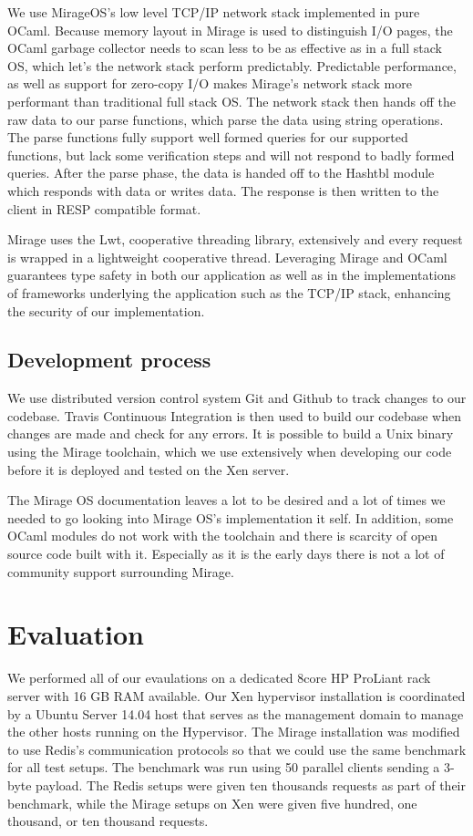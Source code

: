 \documentclass[english,10pt,twocolumn]{article}
\begin{document}
We use MirageOS's low level TCP/IP network stack implemented in pure OCaml.
Because memory layout in Mirage is used to distinguish I/O pages, the OCaml garbage collector needs to scan less to be as effective as in a full stack OS, which let's the network stack perform predictably.
Predictable performance, as well as support for zero-copy I/O makes Mirage's network stack more performant than traditional full stack OS.
The network stack then hands off the raw data to our parse functions, which parse the data using string operations.
The parse functions fully support well formed queries for our supported functions, but lack some verification steps and will not respond to badly formed queries.
After the parse phase, the data is handed off to the Hashtbl module which responds with data or writes data.
The response is then written to the client in RESP compatible format.

Mirage uses the Lwt, cooperative threading library, extensively and every request is wrapped in a lightweight cooperative thread. Leveraging Mirage and OCaml guarantees type safety in both our application as well as in the implementations of frameworks underlying the application such as the TCP/IP stack, enhancing the security of our implementation.


\subsection{Development process}

We use distributed version control system Git and Github to track changes to our codebase.
Travis Continuous Integration is then used to build our codebase when changes are made and check for any errors.
It is possible to build a Unix binary using the Mirage toolchain, which we use extensively when developing our code before it is deployed and tested on the Xen server.

The Mirage OS documentation leaves a lot to be desired and a lot of times we needed to go looking into Mirage OS's implementation it self.
In addition, some OCaml modules do not work with the toolchain and there is scarcity of open source code built with it.
Especially as it is the early days there is not a lot of community support surrounding Mirage.


\section{Evaluation}

We performed all of our evaulations on a dedicated 8\-core HP ProLiant rack server with 16 GB RAM available.
Our Xen hypervisor installation is coordinated by a Ubuntu Server 14.04 host that serves as the management domain to manage the other hosts running on the Hypervisor.
The Mirage installation was modified to use Redis's communication protocols so that we could use the same benchmark for all test setups. The benchmark was run using 50 parallel clients sending a 3-byte payload.
The Redis setups were given ten thousands requests as part of their benchmark, while the Mirage setups on Xen were given five hundred, one thousand, or ten thousand requests.
\end{document}
